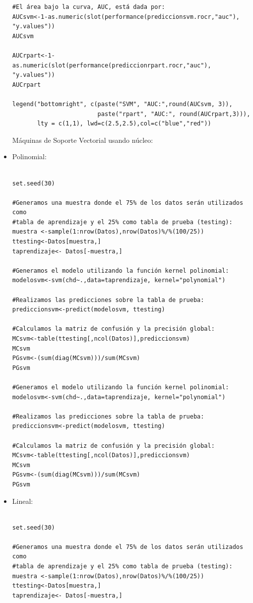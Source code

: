 \documentclass[11pt,a4paper]{report}
\begin{document}
\begin{itemize}
\begin{verbatim}
#El área bajo la curva, AUC, está dada por:
AUCsvm<-1-as.numeric(slot(performance(prediccionsvm.rocr,"auc"), "y.values"))
AUCsvm

AUCrpart<-1- as.numeric(slot(performance(prediccionrpart.rocr,"auc"), "y.values"))
AUCrpart

legend("bottomright", c(paste("SVM", "AUC:",round(AUCsvm, 3)), 
                        paste("rpart", "AUC:", round(AUCrpart,3))), 
       lty = c(1,1), lwd=c(2.5,2.5),col=c("blue","red"))
\end{verbatim}

Máquinas de Soporte Vectorial usando núcleo:

\item Polinomial:
 

\begin{verbatim} 

set.seed(30)

#Generamos una muestra donde el 75% de los datos serán utilizados como 
#tabla de aprendizaje y el 25% como tabla de prueba (testing):
muestra <-sample(1:nrow(Datos),nrow(Datos)%/%(100/25)) 
ttesting<-Datos[muestra,]
taprendizaje<- Datos[-muestra,]

#Generamos el modelo utilizando la función kernel polinomial:
modelosvm<-svm(chd~.,data=taprendizaje, kernel="polynomial") 

#Realizamos las predicciones sobre la tabla de prueba:
prediccionsvm<-predict(modelosvm, ttesting) 

#Calculamos la matriz de confusión y la precisión global:
MCsvm<-table(ttesting[,ncol(Datos)],prediccionsvm) 
MCsvm
PGsvm<-(sum(diag(MCsvm)))/sum(MCsvm)
PGsvm

#Generamos el modelo utilizando la función kernel polinomial:
modelosvm<-svm(chd~.,data=taprendizaje, kernel="polynomial") 

#Realizamos las predicciones sobre la tabla de prueba:
prediccionsvm<-predict(modelosvm, ttesting) 

#Calculamos la matriz de confusión y la precisión global:
MCsvm<-table(ttesting[,ncol(Datos)],prediccionsvm) 
MCsvm
PGsvm<-(sum(diag(MCsvm)))/sum(MCsvm)
PGsvm

\end{verbatim}

\item Lineal:
\begin{verbatim} 

set.seed(30)

#Generamos una muestra donde el 75% de los datos serán utilizados como 
#tabla de aprendizaje y el 25% como tabla de prueba (testing):
muestra <-sample(1:nrow(Datos),nrow(Datos)%/%(100/25)) 
ttesting<-Datos[muestra,]
taprendizaje<- Datos[-muestra,]


\end{verbatim}
\end{itemize}
\end{document}
